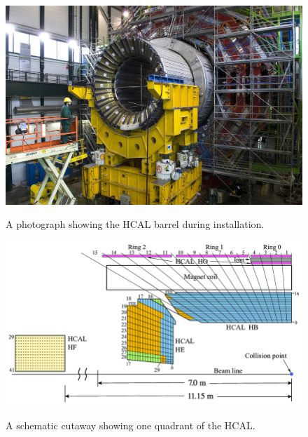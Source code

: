 \begin{figure}[H]
    \centering
    {\includegraphics[width=\textwidth]{Images/CMS/HCal.jpg}}
    \caption{A photograph showing the HCAL barrel during installation.}
    \label{fig:HCAL}
\end{figure}

\begin{figure}[H]
    \centering
    {\includegraphics[width=\textwidth]{Images/CMS/HCALDiagram.png}}
    \caption{A schematic cutaway showing one quadrant of the HCAL.}
    \label{fig:HCALDiagram}
\end{figure}